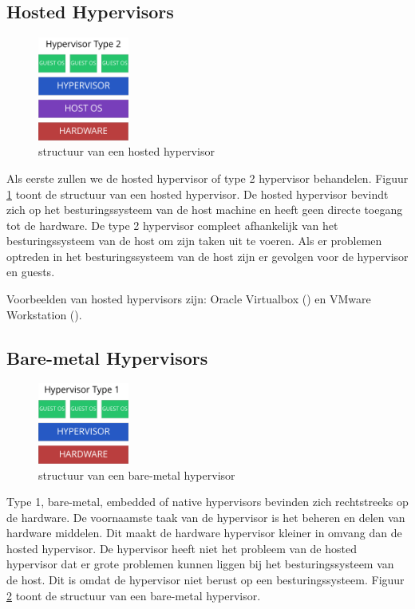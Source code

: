 \documentclass[pdftex,a4paper,12pt,twoside]{report}
\begin{document}
\newpage

\subsection{Hosted Hypervisors}

\begin{figure}
    \centering
    \includegraphics[width=3cm]{img/hypervisor-2}
    \caption{structuur van een hosted hypervisor}
    \label{fig:hypervisor-2}
\end{figure}

Als eerste zullen we de hosted hypervisor of type 2 hypervisor behandelen. Figuur \ref{fig:hypervisor-2} toont de structuur van een hosted hypervisor. De hosted hypervisor bevindt zich op het besturingssysteem van de host machine en heeft geen directe toegang tot de hardware. De type 2 hypervisor compleet afhankelijk van het besturingssysteem van de host om zijn taken uit te voeren. Als er problemen optreden in het besturingssysteem van de host zijn er gevolgen voor de hypervisor en guests.

Voorbeelden van hosted hypervisors zijn: Oracle Virtualbox (\cite{oracle_oracle_2016}) en VMware Workstation (\cite{vmware_vmware_2016-1}).

\subsection{Bare-metal Hypervisors}

\begin{figure}
    \centering
    \includegraphics[width=3cm]{img/hypervisor-1}
    \caption{structuur van een bare-metal hypervisor}
    \label{fig:hypervisor-1}
\end{figure}

Type 1, bare-metal, embedded of native hypervisors bevinden zich rechtstreeks op de hardware. De voornaamste taak van de hypervisor is het beheren en delen van hardware middelen. Dit maakt de hardware hypervisor kleiner in omvang dan de hosted hypervisor. De hypervisor heeft niet het probleem van de hosted hypervisor dat er grote problemen kunnen liggen bij het besturingssysteem van de host. Dit is omdat de hypervisor niet berust op een besturingssysteem. Figuur \ref{fig:hypervisor-1} toont de structuur van een bare-metal hypervisor.
\end{document}
